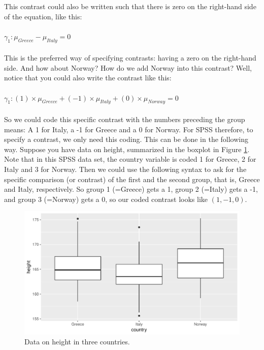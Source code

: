 \documentclass[]{book}\usepackage[]{graphicx}\usepackage[]{color}
\makeatletter
\def\maxwidth{ %
  \ifdim\Gin@nat@width>\linewidth
    \linewidth
  \else
    \Gin@nat@width
  \fi
}
\newenvironment{knitrout}{}{} %
\makeatother
\begin{document}
This contrast could also be written such that there is zero on the right-hand side of the equation, like this:
\\
\\
$\gamma_1: \mu_{Greece}-\mu_{Italy}=0$
\\
\\
This is the preferred way of specifying contrasts: having a zero on the right-hand side. And how about Norway? How do we add Norway into this contrast? Well, notice that you could also write the contrast like this:
\\
\\
$\gamma_1: (1)\times \mu_{Greece} + (-1) \times \mu_{Italy} + (0) \times \mu_{Norway} =0$
\\
\\
So we could code this specific contrast with the numbers preceding the group means: A 1 for Italy, a -1 for Greece and a 0 for Norway. For SPSS therefore, to specify a contrast, we only need this coding. This can be done in the following way. Suppose you have data on height, summarized in the boxplot in Figure \ref{fig:fig1416}. Note that in this SPSS data set, the country variable is coded 1 for Greece, 2 for Italy and 3 for Norway. Then we could use the following syntax to ask for the specific comparison (or contrast) of the first and the second group, that is, Greece and Italy, respectively. So group 1 (=Greece) gets a 1, group 2 (=Italy) gets a -1, and group 3 (=Norway) gets a 0, so our coded contrast looks like $(1, -1, 0)$.



\begin{knitrout}
\color{fgcolor}\begin{figure}

{\centering \includegraphics[width=\maxwidth]{figure/fig1416-1} 

}

\caption[Data on height in three countries]{Data on height in three countries.}\label{fig:fig1416}
\end{figure}


\end{knitrout}
\end{document}

